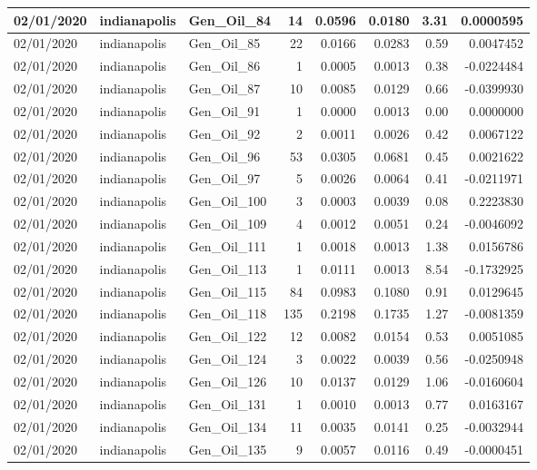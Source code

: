 \documentclass[
  letterpaper,
  DIV=11,
  numbers=noendperiod]{scrartcl}
\begin{document}
\begin{tabular}{l|l|l|r|r|r|r|r}
\hline
02/01/2020 & indianapolis & Gen\_Oil\_84 & 14 & 0.0596 & 0.0180 & 3.31 & 0.0000595\\
\hline
02/01/2020 & indianapolis & Gen\_Oil\_85 & 22 & 0.0166 & 0.0283 & 0.59 & 0.0047452\\
\hline
02/01/2020 & indianapolis & Gen\_Oil\_86 & 1 & 0.0005 & 0.0013 & 0.38 & -0.0224484\\
\hline
02/01/2020 & indianapolis & Gen\_Oil\_87 & 10 & 0.0085 & 0.0129 & 0.66 & -0.0399930\\
\hline
02/01/2020 & indianapolis & Gen\_Oil\_91 & 1 & 0.0000 & 0.0013 & 0.00 & 0.0000000\\
\hline
02/01/2020 & indianapolis & Gen\_Oil\_92 & 2 & 0.0011 & 0.0026 & 0.42 & 0.0067122\\
\hline
02/01/2020 & indianapolis & Gen\_Oil\_96 & 53 & 0.0305 & 0.0681 & 0.45 & 0.0021622\\
\hline
02/01/2020 & indianapolis & Gen\_Oil\_97 & 5 & 0.0026 & 0.0064 & 0.41 & -0.0211971\\
\hline
02/01/2020 & indianapolis & Gen\_Oil\_100 & 3 & 0.0003 & 0.0039 & 0.08 & 0.2223830\\
\hline
02/01/2020 & indianapolis & Gen\_Oil\_109 & 4 & 0.0012 & 0.0051 & 0.24 & -0.0046092\\
\hline
02/01/2020 & indianapolis & Gen\_Oil\_111 & 1 & 0.0018 & 0.0013 & 1.38 & 0.0156786\\
\hline
02/01/2020 & indianapolis & Gen\_Oil\_113 & 1 & 0.0111 & 0.0013 & 8.54 & -0.1732925\\
\hline
02/01/2020 & indianapolis & Gen\_Oil\_115 & 84 & 0.0983 & 0.1080 & 0.91 & 0.0129645\\
\hline
02/01/2020 & indianapolis & Gen\_Oil\_118 & 135 & 0.2198 & 0.1735 & 1.27 & -0.0081359\\
\hline
02/01/2020 & indianapolis & Gen\_Oil\_122 & 12 & 0.0082 & 0.0154 & 0.53 & 0.0051085\\
\hline
02/01/2020 & indianapolis & Gen\_Oil\_124 & 3 & 0.0022 & 0.0039 & 0.56 & -0.0250948\\
\hline
02/01/2020 & indianapolis & Gen\_Oil\_126 & 10 & 0.0137 & 0.0129 & 1.06 & -0.0160604\\
\hline
02/01/2020 & indianapolis & Gen\_Oil\_131 & 1 & 0.0010 & 0.0013 & 0.77 & 0.0163167\\
\hline
02/01/2020 & indianapolis & Gen\_Oil\_134 & 11 & 0.0035 & 0.0141 & 0.25 & -0.0032944\\
\hline
02/01/2020 & indianapolis & Gen\_Oil\_135 & 9 & 0.0057 & 0.0116 & 0.49 & -0.0000451\\

\end{tabular}
\end{document}
